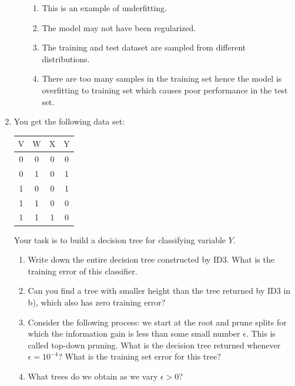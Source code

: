 \documentclass[letterpaper]{article}
\theoremstyle{definition}
\begin{document}
\begin{enumerate}
\begin{enumerate}
\begin{enumerate}
\item This is an example of underfitting.
\item The model may not have been regularized.
\item The training and test dataset are sampled from different
distributions.
\item There are too many samples in the training set hence the
model is overfitting to training set which causes poor
performance in the test set.
\end{enumerate}
\end{enumerate}

\item You get the following data set:

\begin{center}
\begin{tabular}{c|c|c||c}
\(\mathrm{V}\) & \(\mathrm{W}\) & \(\mathrm{X}\) & \(\mathrm{Y}\)\\[0pt]
\hline
0 & 0 & 0 & 0\\[0pt]
0 & 1 & 0 & 1\\[0pt]
1 & 0 & 0 & 1\\[0pt]
1 & 1 & 0 & 0\\[0pt]
1 & 1 & 1 & 0\\[0pt]
\end{tabular}
\end{center}

Your task is to build a decision tree for classifying variable \(Y\).

\begin{enumerate}
\item Write down the entire decision tree constructed by ID3. What is
the training error of this classifier.

\item Can you find a tree with smaller height than the tree returned
by ID3 in b), which also has zero training error?

\item Consider the following process: we start at the root and prune
splits for which the information gain is less than some small
number \(\epsilon\). This is called top-down pruning. What is the
decision tree returned whenever \(\epsilon=10^{-4}\)? What is the
training set error for this tree?

\item What trees do we obtain as we vary \(\epsilon>0\)?
\end{enumerate}


\end{enumerate}
\end{document}

